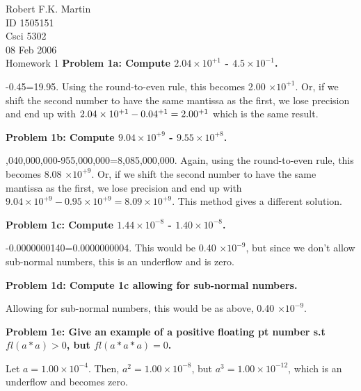 \documentclass[11pt]{article}
\numberwithin{equation}{section}  %
\begin{document}


\noindent Robert F.K. Martin\\
ID 1505151\\
Csci 5302\\
08 Feb 2006\\
Homework 1
\hline
\vspace*{0.25in}
\noindent\textbf{Problem 1a: Compute $2.04 \times 10^{+1}$ - $4.5 \times 10^{-1}$.}

-0.45=19.95. Using the round-to-even rule, this becomes 2.00 $\times 10^{+1}$. Or, if we shift the second number to have the same mantissa as the first, we lose precision and end up with $2.04 \times 10^{+1} - 0.04 \time 10^{+1} = 2.00 \time 10^{+1}$ which is the same result.
\vspace*{0.25in}

\noindent\textbf{Problem 1b: Compute $9.04 \times 10^{+9}$ - $9.55 \times 10^{+8}$.}

,040,000,000-955,000,000=8,085,000,000. Again, using the round-to-even rule, this becomes 8.08 $\times 10^{+9}$. Or, if we shift the second number to have the same mantissa as the first, we lose precision and end up with $9.04 \times 10^{+9} - 0.95 \times 10^{+9} = 8.09 \times 10^{+9}$. This method gives a different solution.
\vspace*{0.25in}

\noindent\textbf{Problem 1c: Compute $1.44 \times 10^{-8}$ - $1.40 \times 10^{-8}$.}

-0.0000000140=0.0000000004. This would be 0.40 $\times 10^{-9}$, but since we don't allow sub-normal numbers, this is an underflow and is zero.
\vspace*{0.25in}

\noindent\textbf{Problem 1d: Compute 1c allowing for sub-normal numbers.}

\noindent Allowing for sub-normal numbers, this would be as above, 0.40 $\times 10^{-9}$.
\vspace*{0.25in}

\noindent\textbf{Problem 1e: Give an example of a positive floating pt number s.t $fl(a \ast a) > 0$, but $fl(a \ast a \ast a) = 0$.}

\noindent Let $a=1.00 \times 10^{-4}$. Then, $a^2=1.00 \times 10^{-8}$, but $a^3=1.00 \times 10^{-12}$, which is an underflow and becomes zero.
\vspace*{0.25in}
\end{document}
